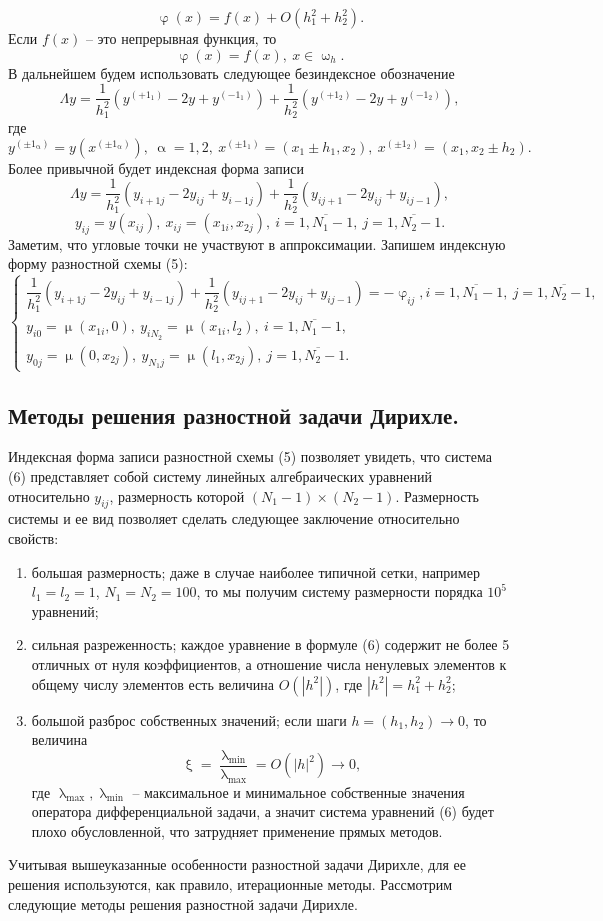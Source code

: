 \documentclass[a4paper, 12pt]{report}
\numberwithin{equation}{section}
\newcommand{\ol}{\overline}
\renewcommand{\alpha}{\upalpha}
\renewcommand{\varphi}{\upvarphi}
\renewcommand{\lambda}{\uplambda}
\renewcommand{\mu}{\upmu}
\renewcommand{\omega}{\upomega}
\renewcommand{\xi}{\upxi}
\begin{document}
	$$\varphi(x) = f(x) + O(h_1^2 + h_2^2).$$
	Если $f(x)$ -- это непрерывная функция, то $$\varphi(x) = f(x),\ x \in \omega_h.$$
	В дальнейшем будем использовать следующее безиндексное обозначение
	$$\Lambda y = \dfrac{1}{h_1^2}(y^{(+1_1)} - 2 y + y^{(-1_1)}) + \dfrac{1}{h_2^2}(y^{(+1_2)} - 2 y + y^{(-1_2)}),$$
	где $$y^{(\pm1_\alpha)} = y(x^{(\pm 1 _\alpha)}), \ \alpha = 1,2,\ x^{(\pm1_1)} = (x_1 \pm h_1, x_2),\ x^{(\pm1_2)} = (x_1, x_2\pm h_2).$$
	Более привычной будет индексная форма записи
	$$\Lambda y = \dfrac{1}{h^2_1}(y_{i+1 j} - 2 y_{ij} + y_{i-1 j}) + \dfrac{1}{h_2^2}(y_{ij+1}-2y_{ij} + y_{ij-1}),$$
	$$y_{ij} = y(x_{ij}),\ x_{ij} = (x_{1i}, x_{2j}),\ i=\ol{1, N_1 -1},\ j = \ol {1, N_2-1}.$$
	Заметим, что угловые точки не участвуют в аппроксимации.
	Запишем индексную форму разностной схемы (5):
	\begin{equation}
		\begin{cases}
			\dfrac{1}{h^2_1}(y_{i+1 j} - 2 y_{ij} + y_{i-1 j}) + \dfrac{1}{h_2^2}(y_{ij+1}-2y_{ij} + y_{ij-1}) = - \varphi_{ij}, i=\ol{1, N_1 -1},\ j = \ol {1, N_2-1},\\
			y_{i0} = \mu(x_{1i}, 0),\ y_{iN_2} = \mu(x_{1i}, l_2),\ i=\ol{1, N_1 -1},\\
			y_{0j} = \mu(0, x_{2j}),\ y_{N_1 j} = \mu(l_1, x_{2j}),\ j=\ol{1, N_2 -1}.
		\end{cases}
	\end{equation}
	\subsection{Методы решения разностной задачи Дирихле.}
	Индексная форма записи разностной схемы (5) позволяет увидеть, что система (6) представляет собой систему линейных алгебраических уравнений относительно $y_{ij}$, размерность которой $(N_1 - 1)\times (N_2 -1)$. Размерность системы и ее вид позволяет сделать следующее заключение относительно свойств:
	\begin{enumerate}
		\item большая размерность; даже в случае наиболее типичной сетки, например $l_1 = l_2 = 1$, $N_1 = N_2 = 100$, то мы получим систему размерности порядка $10^5$ уравнений;
		\item сильная разреженность; каждое уравнение в формуле (6) содержит не более 5 отличных от нуля коэффициентов, а отношение числа ненулевых элементов к общему числу элементов есть величина $O(|h^2|)$, где $|h^2| = h_1^2 + h_2^2$;
		\item большой разброс собственных значений; если шаги $h=(h_1,h _2) \to 0$, то величина $$\xi = \dfrac{\lambda_{\min}}{\lambda_{\max}}= O(|h|^2)\to 0,$$ где $\lambda_{\max}, \lambda_{\min}$ -- максимальное и минимальное собственные значения оператора дифференциальной задачи, а значит система уравнений (6) будет плохо обусловленной, что затрудняет применение прямых методов.
	\end{enumerate}
	Учитывая вышеуказанные особенности разностной задачи Дирихле, для ее решения используются, как правило, итерационные методы. Рассмотрим следующие методы решения разностной задачи Дирихле.
\end{document}
